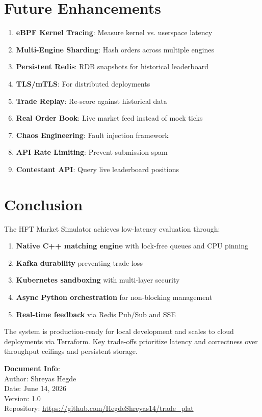 \documentclass[10pt,a4paper,oneside]{report}
\begin{document}
\chapter{Future Enhancements}

\begin{enumerate}
    \item \textbf{eBPF Kernel Tracing}: Measure kernel vs. userspace latency
    \item \textbf{Multi-Engine Sharding}: Hash orders across multiple engines
    \item \textbf{Persistent Redis}: RDB snapshots for historical leaderboard
    \item \textbf{TLS/mTLS}: For distributed deployments
    \item \textbf{Trade Replay}: Re-score against historical data
    \item \textbf{Real Order Book}: Live market feed instead of mock ticks
    \item \textbf{Chaos Engineering}: Fault injection framework
    \item \textbf{API Rate Limiting}: Prevent submission spam
    \item \textbf{Contestant API}: Query live leaderboard positions
\end{enumerate}

\chapter{Conclusion}

The HFT Market Simulator achieves low-latency evaluation through:

\begin{enumerate}
    \item \textbf{Native C++ matching engine} with lock-free queues and CPU pinning
    \item \textbf{Kafka durability} preventing trade loss
    \item \textbf{Kubernetes sandboxing} with multi-layer security
    \item \textbf{Async Python orchestration} for non-blocking management
    \item \textbf{Real-time feedback} via Redis Pub/Sub and SSE
\end{enumerate}

The system is production-ready for local development and scales to cloud deployments via Terraform. Key trade-offs prioritize latency and correctness over throughput ceilings and persistent storage.

\vspace{12pt}
{\small
\textbf{Document Info}: \\
Author: Shreyas Hegde \\
Date: June 14, 2026 \\
Version: 1.0 \\
Repository: \url{https://github.com/HegdeShreyas14/trade_plat}
}
\end{document}
